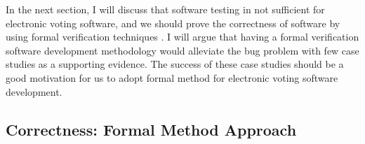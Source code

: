 %   
%   

   In the next section, I will discuss that software testing 
   in not sufficient for electronic voting software, and we should 
   prove the  correctness of software
   by using formal verification techniques \cite{BECKERT2014115}.
   I will argue that  having a formal verification software development methodology would alleviate 
	the bug problem with few case studies as a supporting evidence. The success of these 
	case studies should be a good motivation for us to 
	adopt formal method for electronic voting software development. 
   
   
   \subsection{Correctness: Formal Method Approach}

%	
%	

